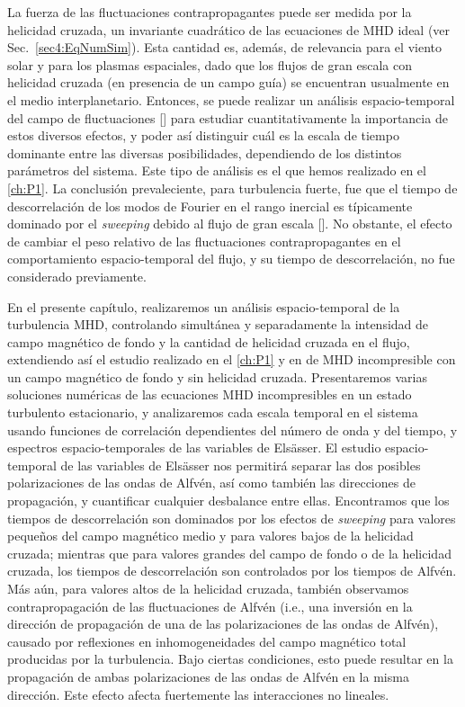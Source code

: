 La fuerza de las fluctuaciones contrapropagantes puede ser medida por
la helicidad cruzada, un invariante cuadrático de las ecuaciones de
MHD ideal (ver Sec.~\ref{sec4:EqNumSim}).  Esta cantidad es, además, de
relevancia para el viento solar y para los plasmas espaciales, dado
que los flujos de gran escala con helicidad cruzada (en presencia de
un campo guía) se encuentran usualmente en el medio
interplanetario. Entonces, se puede realizar un análisis
espacio-temporal del campo de fluctuaciones [\cite{servidio_time_2011,
clark_di_leoni_spatio-temporal_2015}] para estudiar cuantitativamente
la importancia de estos diversos efectos, y poder así distinguir cuál
es la escala de tiempo dominante entre las diversas posibilidades,
dependiendo de los distintos parámetros del sistema. Este tipo de
análisis es el que hemos realizado en el \cref{ch:P1}. La
conclusión prevaleciente, para turbulencia fuerte, fue que el tiempo
de descorrelación de los modos de Fourier en el rango inercial es
típicamente dominado por el \textit{sweeping} debido al flujo de gran
escala [\cite{servidio_time_2011, chen_sweeping_1989,
lugones_2016_spatiotemporal}]. No obstante, el efecto de cambiar el
peso relativo de las fluctuaciones contrapropagantes en el
comportamiento espacio-temporal del flujo, y su tiempo de
descorrelación, no fue considerado previamente.

En el presente capítulo, realizaremos un análisis espacio-temporal de la
turbulencia MHD, controlando simultánea y separadamente la intensidad
de campo magnético de fondo y la cantidad de helicidad cruzada en el
flujo, extendiendo así el estudio realizado en el \cref{ch:P1} y en 
\cite{lugones_2016_spatiotemporal} de MHD incompresible con un campo
magnético de fondo y sin helicidad cruzada. Presentaremos varias
soluciones numéricas de las ecuaciones MHD incompresibles en un estado
turbulento estacionario, y analizaremos cada escala temporal en el
sistema usando funciones de correlación dependientes del número de
onda y del tiempo, y espectros espacio-temporales de las variables de
Els\"asser. El estudio espacio-temporal de las variables de
Els\"asser nos permitirá separar las dos posibles polarizaciones de las
ondas de Alfvén, así como también las direcciones de propagación, y
cuantificar cualquier desbalance entre ellas.
Encontramos que los tiempos de descorrelación son dominados por los
efectos de \textit{sweeping} para valores pequeños del campo magnético medio y
para valores bajos de la helicidad cruzada; mientras que para valores
grandes del campo de fondo o de la helicidad cruzada, los tiempos de
descorrelación son controlados por los tiempos de Alfvén.  Más aún,
para valores altos de la helicidad cruzada, también observamos
contrapropagación de las fluctuaciones de Alfvén (i.e., una inversión
en la dirección de propagación de una de las polarizaciones de las
ondas de Alfvén), causado por reflexiones en inhomogeneidades del
campo magnético total producidas por la turbulencia. Bajo ciertas
condiciones, esto puede resultar en la propagación de ambas
polarizaciones de las ondas de Alfvén en la misma dirección. Este
efecto afecta fuertemente las interacciones no lineales.

